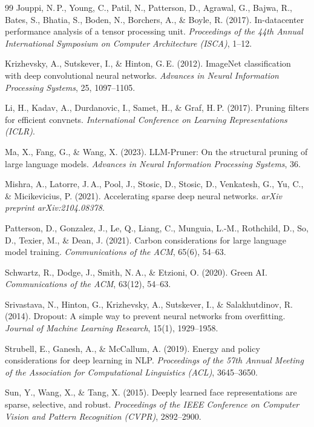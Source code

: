 \documentclass[12pt, a4paper, openany]{report}
\begin{document}
\begin{thebibliography}{99}
Jouppi, N.\,P., Young, C., Patil, N., Patterson, D., Agrawal, G.,
Bajwa, R., Bates, S., Bhatia, S., Boden, N., Borchers, A., \& Boyle, R. (2017).
In-datacenter performance analysis of a tensor processing unit.
\textit{Proceedings of the 44th Annual International Symposium on
Computer Architecture (ISCA)}, 1--12.

Krizhevsky, A., Sutskever, I., \& Hinton, G.\,E. (2012).
ImageNet classification with deep convolutional neural networks.
\textit{Advances in Neural Information Processing Systems}, 25, 1097--1105.

Li, H., Kadav, A., Durdanovic, I., Samet, H., \& Graf, H.\,P. (2017).
Pruning filters for efficient convnets.
\textit{International Conference on Learning Representations (ICLR)}.

Ma, X., Fang, G., \& Wang, X. (2023).
LLM-Pruner: On the structural pruning of large language models.
\textit{Advances in Neural Information Processing Systems}, 36.

Mishra, A., Latorre, J.\,A., Pool, J., Stosic, D., Stosic, D.,
Venkatesh, G., Yu, C., \& Micikevicius, P. (2021).
Accelerating sparse deep neural networks.
\textit{arXiv preprint arXiv:2104.08378}.

Patterson, D., Gonzalez, J., Le, Q., Liang, C., Munguia, L.-M.,
Rothchild, D., So, D., Texier, M., \& Dean, J. (2021).
Carbon considerations for large language model training.
\textit{Communications of the ACM}, 65(6), 54--63.

Schwartz, R., Dodge, J., Smith, N.\,A., \& Etzioni, O. (2020).
Green AI.
\textit{Communications of the ACM}, 63(12), 54--63.

Srivastava, N., Hinton, G., Krizhevsky, A., Sutskever, I., \&
Salakhutdinov, R. (2014).
Dropout: A simple way to prevent neural networks from overfitting.
\textit{Journal of Machine Learning Research}, 15(1), 1929--1958.

Strubell, E., Ganesh, A., \& McCallum, A. (2019).
Energy and policy considerations for deep learning in NLP.
\textit{Proceedings of the 57th Annual Meeting of the Association for
Computational Linguistics (ACL)}, 3645--3650.

Sun, Y., Wang, X., \& Tang, X. (2015).
Deeply learned face representations are sparse, selective, and robust.
\textit{Proceedings of the IEEE Conference on Computer Vision and Pattern
Recognition (CVPR)}, 2892--2900.


\end{thebibliography}
\end{document}
